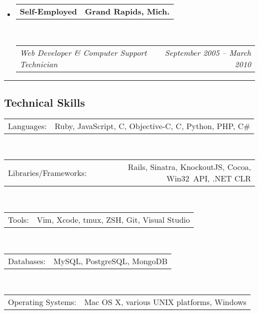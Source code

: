 \documentclass[12pt,letterpaper]{article}
\makeatletter
\newenvironment{indentedsection}[1]
{\begin{list}{}
  {\setlength{\leftmargin}{#1}}
  \item[]
}
{\end{list}}
\newcommand{\floatcols}[2]
{\begin{tabular*}{\linewidth}{l@{\extracolsep{\fill}}r}
  #1 &
  #2 \\
\end{tabular*}}
\newcommand{\CPP}
{C\nolinebreak[4]\hspace{-.05em}\raisebox{.22ex}{\footnotesize\bf ++}}
\makeatother
\begin{document}
\begin{itemize}
  \item
    \floatcols
      {\textbf{Self-Employed}}
      {\textbf{Grand Rapids, Mich.}}
    \\
    \floatcols
      {\emph{Web Developer \& Computer Support Technician}}
      {\emph{September 2005 -- March 2010}}
\end{itemize}


\hrule
\vspace{-0.4em}
\subsection*{Technical Skills}

\begin{indentedsection}{\parindent}
  \floatcols
    {Languages:}
    {Ruby, JavaScript, C, Objective-C, \CPP, Python, PHP, C\#}
  \\[.4em]
  \floatcols
    {Libraries/Frameworks:}
    {Rails, Sinatra, KnockoutJS, Cocoa, Win32~API, .NET CLR}
  \\[.4em]
  \floatcols
    {Tools:}
    {Vim, Xcode, tmux, ZSH, Git, Visual Studio}
  \\[.4em]
  \floatcols
    {Databases:}
    {MySQL, PostgreSQL, MongoDB}
  \\[.4em]
  \floatcols
    {Operating Systems:}
    {Mac OS X, various UNIX platforms, Windows}
\end{indentedsection}
\end{document}
